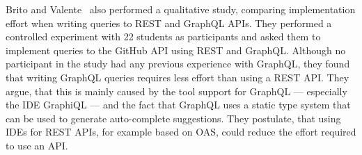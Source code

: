 Brito and Valente~\cite{Brito2020} also performed a qualitative study, comparing implementation effort when writing queries to \ac{REST} and GraphQL \acp{API}.
They performed a controlled experiment with 22 students as participants and asked them to implement queries to the GitHub \ac{API} using \ac{REST} and GraphQL.
Although no participant in the study had any previous experience with GraphQL, they found that writing GraphQL queries requires less effort than using a \ac{REST} \ac{API}.
They argue, that this is mainly caused by the tool support for GraphQL --- especially the \ac{IDE} GraphiQL --- and the fact that GraphQL uses a static type system that can be used to generate auto-complete suggestions.
They postulate, that using \acp{IDE} for \ac{REST} \acp{API}, for example based on \ac{OAS}, could reduce the effort required to use an \ac{API}.